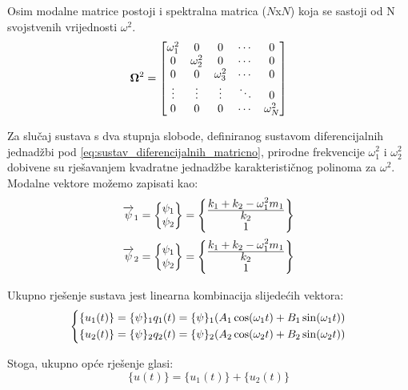 Osim modalne matrice postoji i spektralna matrica ($N$x$N$) koja se sastoji od N
svojstvenih vrijednosti $\omega^2$.
\[
	\mathbf{\Omega}^2 
	= 
	\begin{bmatrix}
		\omega_1^2 & 0 & 0 & \cdots & 0 \\
		0 & \omega_2^2 & 0 & \cdots & 0 \\
		0 & 0 & \omega_3^2 & \cdots & 0 \\
		\vdots  & \vdots  & \vdots  & \ddots &  0 \\
		0 & 0 & 0 & \cdots &  \omega_N^2 
	\end{bmatrix}
\]


Za slučaj sustava s dva stupnja slobode, definiranog sustavom diferencijalnih
jednadžbi pod \eqref{eq:sustav_diferencijalnih_matricno}, prirodne frekvencije 
$\omega_1^2$ i $\omega_2^2$ dobivene su rješavanjem kvadratne jednadžbe karakterističnog
polinoma za $\omega^2$. Modalne vektore možemo zapisati kao:
\begin{align}
    \overrightarrow{\psi}_1=
    \begin{Bmatrix}
        \psi_1\\
        \psi_2
    \end{Bmatrix}
    &=
    \begin{Bmatrix}
        \frac{\displaystyle k_1+k_2-\omega_1^2m_1}{\displaystyle k_2}\\
        1
    \end{Bmatrix}\\
    \overrightarrow{\psi}_2=
    \begin{Bmatrix}
        \psi_1\\
        \psi_2
    \end{Bmatrix}
    &=
    \begin{Bmatrix}
        \frac{\displaystyle k_1+k_2-\omega_1^2m_1}{\displaystyle k_2}\\
        1
    \end{Bmatrix}
\end{align}

Ukupno rješenje sustava jest linearna kombinacija slijedećih vektora:
\begin{equation}
    \begin{dcases}
        \{u_1(t)\} = \{\psi\}_1 q_1(t) = \{\psi\}_1 (A_1\cos(\omega_1 t) + B_1\sin(\omega_1 t))\\
        \{u_2(t)\} = \{\psi\}_2 q_2(t) = \{\psi\}_2 (A_2\cos(\omega_2 t) + B_2\sin(\omega_2 t))
    \end{dcases}
\end{equation}

Stoga, ukupno opće rješenje glasi:
\begin{equation}\label{eq:ukupno_opce_rjesenje_2dof}
    \{u(t)\}=\{u_1(t)\}+\{u_2(t)\}
\end{equation}

